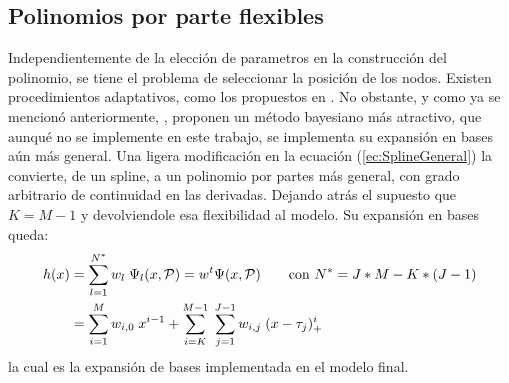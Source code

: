 \documentclass[../Main/Main.tex]{subfiles}
\begin{document}
\subsection{Polinomios por parte flexibles}
Independientemente de la elección de parametros en la construcción del polinomio, se tiene el problema de seleccionar la posición de los nodos. Existen procedimientos adaptativos, como los propuestos en \autocite{friedman1991multivariate}. No obstante, y como ya se mencionó anteriormente, \autocite{mallik1998automatic}, proponen un método bayesiano más atractivo, que aunqué no se implemente en este trabajo, se implementa su expansión en bases aún más general. Una ligera modificación en la ecuación (\ref{ec:SplineGeneral}) la convierte, de un spline, a un polinomio por partes más general, con grado arbitrario de continuidad en las derivadas. Dejando atrás el supuesto que $K = M-1$ y devolviendole esa flexibilidad al modelo. Su expansión en bases queda:
\begin{align}
	h(x) &= \sum_{l = 1}^{N^*} w_l \; \Psi_l(x,\mathcal{P}) = w^t\Psi(x,\mathcal{P}) \qquad \text{con  } N^* = J*M - K*(J-1) 
\label{ec:ExpBase_NEstrella} \\ 
 		 &=	\sum_{i = 1}^M w_{i,0} \; x^{i-1} + 
			\sum_{i = K}^{M-1} \;
	 		\sum_{j = 1}^{J-1}w_{i,j}\;(x - \tau_j)_+^{i}
	 			\label{ec:PoliMallik}
\end{align}
la cual es la expansión de bases implementada en el modelo final.\\
\end{document}
